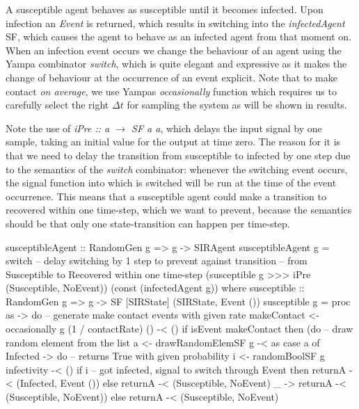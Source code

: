 A susceptible agent behaves as susceptible until it becomes infected. Upon infection an \textit{Event} is returned, which results in switching into the \textit{infectedAgent} SF, which causes the agent to behave as an infected agent from that moment on. When an infection event occurs we change the behaviour of an agent using the Yampa combinator \textit{switch}, which is quite elegant and expressive as it makes the change of behaviour at the occurrence of an event explicit. Note that to make contact \textit{on average}, we use Yampas \textit{occasionally} function which requires us to carefully select the right $\Delta t$ for sampling the system as will be shown in results. 

Note the use of \textit{iPre :: a $\rightarrow$ SF a a}, which delays the input signal by one sample, taking an initial value for the output at time zero. The reason for it is that we need to delay the transition from susceptible to infected by one step due to the semantics of the \textit{switch} combinator: whenever the switching event occurs, the signal function into which is switched will be run at the time of the event occurrence. This means that a susceptible agent could make a transition to recovered within one time-step, which we want to prevent, because the semantics should be that only one state-transition can happen per time-step.

\begin{HaskellCode}
susceptibleAgent :: RandomGen g => g -> SIRAgent
susceptibleAgent g 
    = switch 
      -- delay switching by 1 step to prevent against transition
      -- from Susceptible to Recovered within one time-step
      (susceptible g >>> iPre (Susceptible, NoEvent)) 
      (const (infectedAgent g))
  where
    susceptible :: RandomGen g => g -> SF [SIRState] (SIRState, Event ())
    susceptible g = proc as -> do
      -- generate make contact events with given rate
      makeContact <- occasionally g (1 / contactRate) () -< ()
      if isEvent makeContact
        then (do
          -- draw random element from the list
          a <- drawRandomElemSF g -< as
          case a of
            Infected -> do
              -- returns True with given probability
              i <- randomBoolSF g infectivity -< ()
              if i
                -- got infected, signal to switch through Event
                then returnA -< (Infected, Event ())
                else returnA -< (Susceptible, NoEvent)
             _       -> returnA -< (Susceptible, NoEvent))
        else returnA -< (Susceptible, NoEvent)
\end{HaskellCode}


